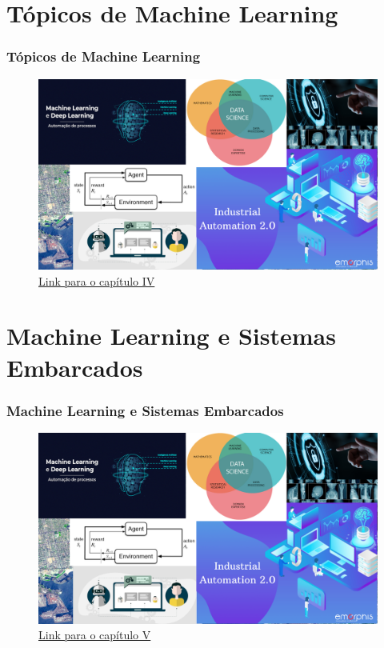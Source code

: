 \documentclass{beamer}
\begin{document}
\section{Tópicos de Machine Learning}

\begin{frame}

    \frametitle{Tópicos de Machine Learning}
    \begin{figure}[ht]
        \centering
        \includegraphics[scale=0.5]{Capitulo4.png}
        \caption{\href{run:./capitulos/Capitulo_04/Capitulo04.pdf}{Link para o capítulo IV}}
    \end{figure}

\end{frame}

\section{Machine Learning e Sistemas Embarcados}

\begin{frame}

    \frametitle{Machine Learning e Sistemas Embarcados}
    \begin{figure}[ht]
        \centering
        \includegraphics[scale=0.5]{Capitulo5.png}
        \caption{\href{run:./capitulos/Capitulo_05/Capitulo05.pdf}{Link para o capítulo V}}
    \end{figure}

\end{frame}
\end{document}

